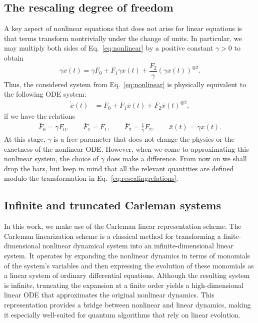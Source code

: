 \documentclass[superscriptaddress,onecolumn,nofootinbib,longbibliography,a4paper,accepted=2026-09-29]{quantumarticle}
\theoremstyle{plain}
\theoremstyle{definition}
\numberwithin{thm}{section}
\numberwithin{assumption}{section}
\numberwithin{lemma}{section}
\numberwithin{prop}{section}
\numberwithin{cor}{section}
\numberwithin{definition}{section}
\numberwithin{rmk}{section}
\numberwithin{equation}{section}
\begin{document}

\subsection{The rescaling degree of freedom}
\label{sec:rescaling}

A key aspect of nonlinear equations that does not arise for linear equations is that terms transform nontrivially under the change of units. In particular, we may multiply both sides of Eq.~\eqref{eq:nonlinear} by a positive constant $\gamma >0$ to obtain
\begin{equation}
    \gamma \dot{x}(t) = \gamma F_0 + F_1 \gamma x(t)+ \frac{F_2}{\gamma} \left (\gamma x(t) \right )^{\otimes 2}.
\end{equation}
Thus, the considered system from Eq.~\eqref{eq:nonlinear} is physically equivalent to the following ODE system:
\begin{align}
\label{eq:gammarescaledsystem} 
\dot{\bar{x}}(t) &= \bar{F}_0+ \bar{F}_1 \bar{x}(t)+ \bar{F}_2 \bar{x}(t)^{\otimes 2},
\end{align}
if we have the relations
\begin{align}
    \bar{F}_0  = \gamma F_0, \qquad
    \bar{F}_1 = F_1, \qquad
    \bar{F}_2 =  \frac{1}{\gamma}F_2, \qquad
    \bar{x}(t) = \gamma x(t).
    \label{eq:rescalingrelations}
\end{align}
At this stage, $\gamma$ is a free parameter that does not change the physics or the exactness of the nonlinear ODE. However, when we come to approximating this nonlinear system, the choice of $\gamma$ does make a difference. From now on we shall drop the bars, but keep in mind that all the relevant quantities are defined modulo the transformation in Eq.~\eqref{eq:rescalingrelations}.


\subsection{Infinite and truncated Carleman systems}\label{sec:Core-Carleman}

In this work, we make use of the Carleman linear representation scheme. The Carleman linearization scheme is a classical method for transforming a finite-dimensional nonlinear dynamical system into an infinite-dimensional linear system. It operates by expanding the nonlinear dynamics in terms of monomials of the system's variables and then expressing the evolution of these monomials as a linear system of ordinary differential equations. Although the resulting system is infinite, truncating the expansion at a finite order yields a high-dimensional linear ODE that approximates the original nonlinear dynamics. This representation provides a bridge between nonlinear and linear dynamics, making it especially well-suited for quantum algorithms that rely on linear evolution.
\end{document}
